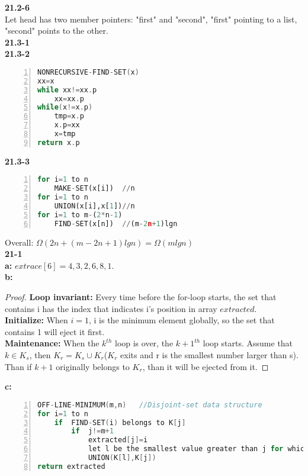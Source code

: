 \documentclass{article}
\begin{document}
\textbf{21.2-6}\\
Let head has two member pointers: "first" and "second", "first" pointing to a list, "second" points to the other.\\ 
\textbf{21.3-1}\\
\textbf{21.3-2}
\begin{lstlisting}[language=C,numbers=left]
NONRECURSIVE-FIND-SET(x)
xx=x
while xx!=xx.p
	xx=xx.p
while(x!=x.p)
	tmp=x.p
	x.p=xx
	x=tmp
return x.p
\end{lstlisting}
\textbf{21.3-3}
\begin{lstlisting}[language=Python,numbers=left]
for i=1 to n
	MAKE-SET(x[i])	//n
for i=1 to n
	UNION(x[i],x[1])//n
for i=1 to m-(2*n-1)
	FIND-SET(x[n])  //(m-2n+1)lgn
\end{lstlisting}
Overall: $\Omega(2n+(m-2n+1)lgn)=\Omega(mlgn)$\\
\textbf{21-1}\\
\textbf{a:}
$extrace[6]=4,3,2,6,8,1$.\\
\textbf{b:}
\begin{proof}
\textbf{Loop invariant:} Every time before the for-loop starts, the set that contains i has the index that indicates i's position in array $extracted$.\\
\textbf{Initialize:} When $i=1$, i is the minimum element globally, so the set that contains 1 will eject it first.\\
\textbf{Maintenance:} When the $k^{th}$ loop is over, the ${k+1}^{th}$ loop starts. Assume that $k\in K_s$, then $K_r=K_s\cup K_{r}$($K_r$ exits and r is the smallest number larger than s). Than if $k+1$ originally belongs to $K_r$, than it will be ejected from it.    
\end{proof}
\textbf{c:}
\begin{lstlisting}[language=C,numbers=left]
OFF-LINE-MINIMUM(m,n)	//Disjoint-set data structure
for i=1 to n
	if	FIND-SET(i) belongs to K[j]
		if	j!=m+1
			extracted[j]=i
			let l be the smallest value greater than j for which set K[l] exits
			UNION(K[l],K[j])
return extracted
\end{lstlisting}
\end{document}
